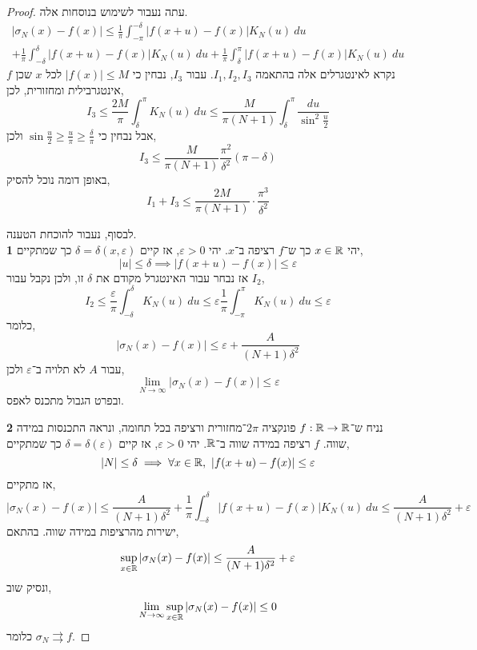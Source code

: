 \begin{proof}
	עתה נעבור לשימוש בנוסחות אלה.
	\begin{multline*}
		|\sigma_N(x) - f(x)|
		\le \frac{1}{\pi} \int_{-\pi}^{-\delta} |f(x + u) - f(x)| K_N(u)\ du \\
		+ \frac{1}{\pi} \int_{-\delta}^{\delta} |f(x + u) - f(x)| K_N(u)\ du + \frac{1}{\pi} \int_{\delta}^{\pi} |f(x + u) - f(x)| K_N(u)\ du
	\end{multline*}
	נקרא לאינטגרלים אלה בהתאמה $I_1, I_2, I_3$.
	עבור $I_3$, נבחין כי $|f(x)| \le M$ לכל $x$ שכן $f$ אינטגרבילית ומחזורית, לכן,
	\[
		I_3
		\le \frac{2 M}{\pi} \int_{\delta}^{\pi} K_N(u)\ du
		\le \frac{M}{\pi(N + 1)} \int_{\delta}^{\pi} \frac{du}{\sin^2 \frac{u}{2}}
	\]
	אבל נבחין כי $\sin \frac{u}{2} \ge \frac{u}{\pi} \ge \frac{\delta}{\pi}$ ולכן,
	\[
		I_3
		\le \frac{M}{\pi (N + 1)} \frac{\pi^2}{\delta^2}(\pi - \delta)
	\]
	באופן דומה נוכל להסיק,
	\[
		I_1 + I_3
		\le \frac{2 M}{\pi (N + 1)} \cdot \frac{\pi^3}{\delta^2}
	\]

	לבסוף, נעבור להוכחת הטענה. \\
	\textbf{1}
	יהי $x \in \mathbb{R}$ כך ש־$f$ רציפה ב־$x$.
		יהי $\varepsilon > 0$, אז קיים $\delta = \delta(x, \varepsilon)$ כך שמתקיים,
		\[
			|u|
			\le \delta
			\implies |f(x + u) - f(x)| \le \varepsilon
		\]
		אז נבחר עבור האינטגרל מקודם את $\delta$ זו, ולכן נקבל עבור $I_2$,
		\[
			I_2
			\le \frac{\varepsilon}{\pi} \int_{-\delta}^{\delta} K_N(u)\ du
			\le \varepsilon \frac{1}{\pi} \int_{-\pi}^{\pi} K_N(u)\ du
			\le \varepsilon
		\]
		כלומר,
		\[
			|\sigma_N(x) - f(x)|
			\le \varepsilon + \frac{A}{(N + 1) \delta^2}
		\]
		עבור $A$ לא תלויה ב־$\varepsilon$ ולכן,
		\[
			\lim_{N \to \infty} |\sigma_N(x) - f(x)|
			\le \varepsilon
		\]
		ובפרט הגבול מתכנס לאפס.

		\textbf{2}
		נניח ש־$f : \mathbb{R} \to \mathbb{R}$ פונקציה $2 \pi$־מחזורית ורציפה בכל תחומה, ונראה התכנסות במידה שווה.
		$f$ רציפה במידה שווה ב־$\mathbb{R}$.
		יהי $\varepsilon > 0$, אז קיים $\delta = \delta(\varepsilon)$ כך שמתקיים,
		\[
			|N| \le \delta
			\implies \forall x \in \mathbb{R},\ |f(x + u) - f(x)| \le \varepsilon
		\]
		אז מתקיים,
		\[
			|\sigma_N(x) - f(x)|
			\le \frac{A}{(N + 1) \delta^2} + \frac{1}{\pi} \int_{-\delta}^{\delta} |f(x + u) - f(x)| K_N(u)\ du
			\le \frac{A}{(N + 1) \delta^2} + \varepsilon
		\]
		ישירות מהרציפות במידה שווה.
		בהתאם,
		\[
			\sup_{x \in \mathbb{R}} |\sigma_N(x) - f(x)|
			\le \frac{A}{(N + 1) \delta^2} + \varepsilon
		\]
		ונסיק שוב,
		\[
			\lim_{N \to \infty} \sup_{x \in \mathbb{R}} |\sigma_N(x) - f(x)|
			\le 0
		\]
		כלומר $\sigma_N \rightrightarrows f$.
\end{proof}

